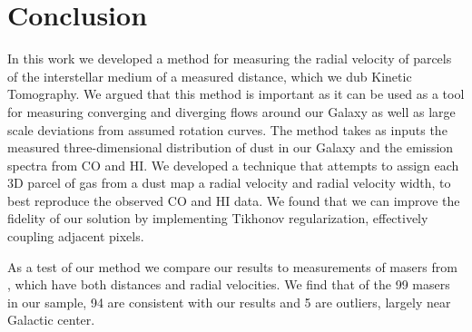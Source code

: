 \section{Conclusion}
\label{sec:conclusion}

In this work we developed a method for measuring the radial velocity of parcels of the interstellar medium of a measured distance, which we dub  Kinetic Tomography. We argued that this method is important as it can be used as a tool for measuring converging and diverging flows around our Galaxy as well as large scale deviations from assumed rotation curves. The method takes as inputs the measured three-dimensional distribution of dust in our Galaxy and the emission spectra from CO and HI. We developed a technique that attempts to assign each 3D parcel of gas from a dust map a radial velocity and radial velocity width, to best reproduce the observed CO and HI data. We found that we can improve the fidelity of our solution by implementing Tikhonov regularization, effectively coupling adjacent pixels. 

As a test of our method we compare our results to measurements of masers from \Reid{}, which have both distances and radial velocities. We find that of the 99 masers in our sample, 94 are consistent with our results and 5 are outliers, largely near Galactic center. 


